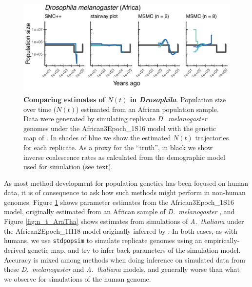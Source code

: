 \documentclass[12pt,halfline,a4paper]{ouparticle}
\newcommand{\stdpopsim}{\texttt{stdpopsim}\xspace}
\begin{document}
\begin{figure}
\begin{center}
\includegraphics[width=0.8\linewidth]{display_items/DroMel_African3Epoch_1S16.pdf}
\caption{\textbf{Comparing estimates of $N(t)$ in \textit{Drosophila}}. Population
size over time ($N(t)$) estimated from an African population sample. Data were generated by simulating
replicate \textit{D.~melanogaster} genomes under the African3Epoch\_1S16 model \citep{sheehan2016deep}
with the genetic map of \cite{comeron2012many}. In shades of blue we show the estimated
$N(t)$ trajectories for each replicate.
As a proxy for the ``truth'', in black we show inverse coalescence rates
as calculated from the demographic model used for simulation (see text).
}
\label{fig:n_t_sheehan}
\end{center}
\end{figure}

As most method development for population genetics has been focused on human
data, it is of consequence to ask how such methods might perform in non-human
genomes. Figure \ref{fig:n_t_sheehan} shows parameter estimates from the African3Epoch\_1S16
model, originally estimated from an African sample of \textit{D.~melanogaster} \citep{sheehan2016deep},
and Figure \ref{fig:n_t_AraTha} shows estimates from simulations of \textit{A.~thaliana}
under the African2Epoch\_1H18 model originally inferred by \cite{huber2018gene}.
In both cases, as with humans, we use \stdpopsim to simulate replicate genomes using an empirically-derived genetic map,
and try to infer back parameters of the simulation model.
Accuracy is mixed among methods when doing inference on simulated data from these \textit{D.~melanogaster}
and \textit{A.~thaliana} models, and generally worse than what we
observe for simulations of the human genome.
\end{document}
